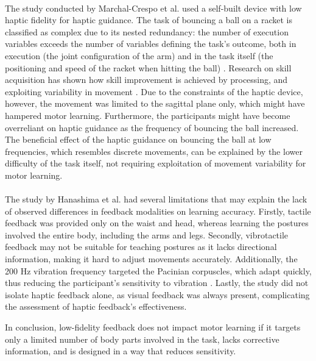 \paragraph{}
The study conducted by Marchal-Crespo et al. used a self-built device with low haptic fidelity for haptic guidance. The task of bouncing a ball on a racket is classified as complex due to its nested redundancy: the number of execution variables exceeds the number of variables defining the task's outcome, both in execution (the joint configuration of the arm) and in the task itself (the positioning and speed of the racket when hitting the ball) \cite{Levac2019LearningReview}. Research on skill acquisition has shown how skill improvement is achieved by processing, and exploiting variability in movement \cite{Sternad2018ItsLearning}. Due to the constraints of the haptic device, however, the movement was limited to the sagittal plane only, which might have hampered motor learning. Furthermore, the participants might have become overreliant on haptic guidance as the frequency of bouncing the ball increased. The beneficial effect of the haptic guidance on bouncing the ball at low frequencies, which resembles discrete movements, can be explained by the lower difficulty of the task itself, not requiring exploitation of movement variability for motor learning.

\paragraph{}
The study by Hanashima et al. had several limitations that may explain the lack of observed differences in feedback modalities on learning accuracy. Firstly, tactile feedback was provided only on the waist and head, whereas learning the postures involved the entire body, including the arms and legs. Secondly, vibrotactile feedback may not be suitable for teaching postures as it lacks directional information, making it hard to adjust movements accurately. Additionally, the 200 Hz vibration frequency targeted the Pacinian corpuscles, which adapt quickly, thus reducing the participant's sensitivity to vibration \cite{Hanashima2023}. Lastly, the study did not isolate haptic feedback alone, as visual feedback was always present, complicating the assessment of haptic feedback's effectiveness.

In conclusion, low-fidelity feedback does not impact motor learning if it targets only a limited number of body parts involved in the task, lacks corrective information, and is designed in a way that reduces sensitivity.


